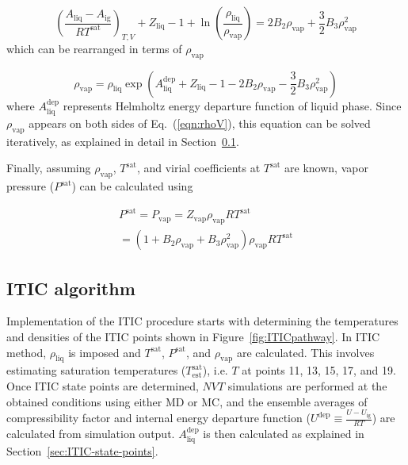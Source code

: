 \documentclass[5p,times]{elsarticle}
\begin{document}
\begin{equation}
\left( \frac{ A_\mathrm{liq} - A_\mathrm{ig} }{RT^\mathrm{sat}} \right)_{T,V} + {Z_{\mathrm{liq}}} - 1 + \ln \left( \frac{{{\rho _{\mathrm{liq}}}}}{{{\rho _{\mathrm{vap}}}}} \right) = 2{B_2} {\rho _{\mathrm{vap}}} + \frac{3}{2}{B_3} \rho _{\mathrm{vap}}^2 
\label{eqn:eqn14}
\end{equation}
which can be rearranged in terms of ${\rho_\mathrm{vap}}$ 

\begin{equation}
\rho _{\mathrm{vap}} = \rho _\mathrm{liq} \exp \left( A^\mathrm{dep}_\mathrm{liq} + {Z_{\mathrm{liq}}} - 1 - 2{B_2} {\rho _{\mathrm{vap}}} - \frac{3}{2}{B_3} \rho _{\mathrm{vap}}^2
\right)
\label{eqn:rhoV}
\end{equation}
where $A^\mathrm{dep}_\mathrm{liq}$ represents Helmholtz energy departure function of liquid phase. Since $\rho_\mathrm{vap}$ appears on both sides of Eq.~(\ref{eqn:rhoV}), this equation can be solved iteratively, as explained in detail in Section~\ref{sec:ITIC-algorithm}. 

Finally, assuming $\rho_\mathrm{vap}$, $T^\mathrm{sat}$, and virial coefficients at $T^\mathrm{sat}$ are known, vapor pressure ($P^\mathrm{sat}$) can be calculated using

\begin{equation}
\begin{array}{l}
P^\mathrm{sat} = P_\mathrm{vap} = {Z_\mathrm{vap}}{\rho _\mathrm{vap}}RT^\mathrm{sat}
\\
= (1 + {B_2} {\rho_\mathrm{vap}} + {B_3}\rho _\mathrm{vap}^2){\rho _\mathrm{vap}}RT^\mathrm{sat} 
\end{array}
\label{eqn:psat}
\end{equation}

\subsection{ITIC algorithm}\label{sec:ITIC-algorithm}
Implementation of the ITIC procedure starts with determining the temperatures and densities of the ITIC points shown in Figure~\ref{fig:ITICpathway}. In ITIC method, $\rho_\mathrm{liq}$ is imposed and $T^\mathrm{sat}$, $P^\mathrm{sat}$, and $\rho_\mathrm{vap}$ are calculated. This involves estimating saturation temperatures ($T^\mathrm{sat}_\mathrm{est}$), i.e. $T$ at points 11, 13, 15, 17, and 19. Once ITIC state points are determined, $NVT$ simulations are performed at the obtained conditions using either MD or MC, and the ensemble averages of compressibility factor and internal energy departure function ($U^\mathrm{dep} \equiv \frac{U-U_\mathrm{ig}}{RT}$) are calculated from simulation output. $A^\mathrm{dep}_\mathrm{liq}$ is then calculated as explained in Section~\ref{sec:ITIC-state-points}. 
\end{document}
